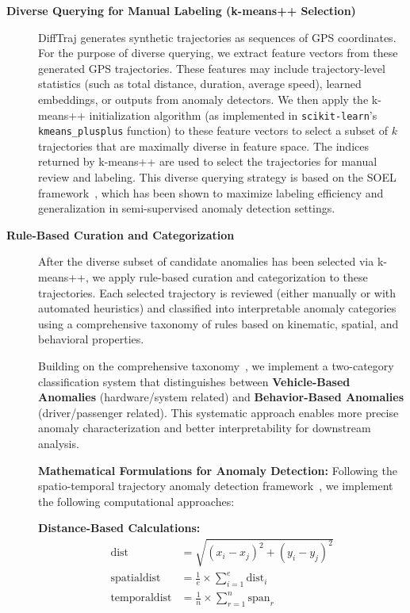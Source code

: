 \documentclass[runningheads]{llncs}
\begin{document}
\begin{description}
    \item[\textbf{Diverse Querying for Manual Labeling (k-means++ Selection)}] DiffTraj generates synthetic trajectories as sequences of GPS coordinates. For the purpose of diverse querying, we extract feature vectors from these generated GPS trajectories. These features may include trajectory-level statistics (such as total distance, duration, average speed), learned embeddings, or outputs from anomaly detectors. We then apply the k-means++ initialization algorithm (as implemented in \texttt{scikit-learn}'s \texttt{kmeans\_plusplus} function) to these feature vectors to select a subset of $k$ trajectories that are maximally diverse in feature space. The indices returned by k-means++ are used to select the trajectories for manual review and labeling. This diverse querying strategy is based on the SOEL framework~\cite{liDeepAnomalyDetection2023}, which has been shown to maximize labeling efficiency and generalization in semi-supervised anomaly detection settings.
    
    \item[\textbf{Rule-Based Curation and Categorization}] After the diverse subset of candidate anomalies has been selected via k-means++, we apply rule-based curation and categorization to these trajectories. Each selected trajectory is reviewed (either manually or with automated heuristics) and classified into interpretable anomaly categories using a comprehensive taxonomy of rules based on kinematic, spatial, and behavioral properties.

    Building on the comprehensive taxonomy~\cite{kongMobileTrajectoryAnomaly2024}, we implement a two-category classification system that distinguishes between \textbf{Vehicle-Based Anomalies} (hardware/system related) and \textbf{Behavior-Based Anomalies} (driver/passenger related). This systematic approach enables more precise anomaly characterization and better interpretability for downstream analysis.

    \textbf{Mathematical Formulations for Anomaly Detection:} Following the spatio-temporal trajectory anomaly detection framework~\cite{heEnhancedDBSCANMultiple2020}, we implement the following computational approaches:

    \textbf{Distance-Based Calculations:}
    \begin{align}
    \text{dist} &= \sqrt{(x_i - x_j)^2 + (y_i - y_j)^2} \label{eq:euclidean}\\
    \text{spatialdist} &= \frac{1}{e} \times \sum_{i=1}^{e} \text{dist}_i \label{eq:spatial}\\
    \text{temporaldist} &= \frac{1}{n} \times \sum_{r=1}^{n} \text{span}_r \label{eq:temporal}
    \end{align}


\end{description}
\end{document}
